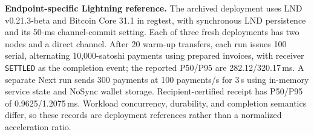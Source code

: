 \noindent\textbf{Endpoint-specific Lightning reference.}
The archived deployment uses LND v0.21.3-beta and Bitcoin Core 31.1 in
regtest, with synchronous LND persistence and its 50-ms channel-commit
setting. Each of three fresh deployments has two nodes and a direct channel.
After 20 warm-up transfers, each run issues 100 serial, alternating
10,000-satoshi payments using prepared invoices, with receiver
\texttt{SETTLED} as the completion event; the reported P50/P95 are
282.12/320.17\,ms. A separate Next run sends 300 payments at 100 payments/s
for 3\,s using in-memory service state and NoSync wallet storage.
Recipient-certified receipt has P50/P95 of 0.9625/1.2075\,ms. Workload
concurrency, durability, and completion semantics differ, so these records are
deployment references rather than a normalized acceleration ratio.

